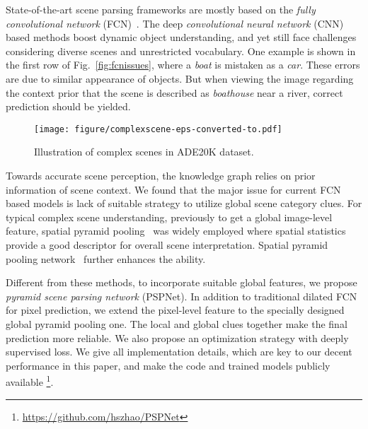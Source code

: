 \documentclass[10pt,twocolumn,letterpaper]{article}
\begin{document}
State-of-the-art scene parsing frameworks are mostly based on the {\it fully
convolutional network} (FCN)~\cite{long2015fully}. The deep {\it convolutional neural
network} (CNN) based methods boost dynamic object understanding, and yet still face
challenges considering diverse scenes and unrestricted vocabulary. One example is shown
in the first row of Fig.~\ref{fig:fcnissues}, where a {\it boat} is mistaken as a {\it
car}. These errors are due to similar appearance of objects. But when viewing the image
regarding the context prior that the scene is described as {\it boathouse} near a river,
correct prediction should be yielded.

\begin{figure}[t]
\centering
\texttt{[image: figure/complexscene-eps-converted-to.pdf]}
\caption{Illustration of complex scenes in ADE20K dataset. } \label{fig:intro}
\end{figure}

Towards accurate scene perception, the knowledge graph relies on prior information of
scene context. We found that the major issue for current FCN based models is lack of
suitable strategy to utilize global scene category clues. For typical complex scene
understanding, previously to get a global image-level feature, spatial pyramid
pooling~\cite{lazebnik2006beyond} was widely employed where spatial statistics provide a
good descriptor for overall scene interpretation. Spatial pyramid pooling
network~\cite{he2014spatial} further enhances the ability.

Different from these methods, to incorporate suitable global features, we propose {\it
pyramid scene parsing network} (PSPNet). In addition to traditional dilated FCN
\cite{chen2014semantic,yu2015multi} for pixel prediction, we extend the pixel-level
feature to the specially designed global pyramid pooling one. The local and global clues
together make the final prediction more reliable. We also propose an optimization
strategy with deeply supervised loss. We give all implementation details, which are key
to our decent performance in this paper, and make the code and trained models publicly
available
\footnote{\href{https://github.com/hszhao/PSPNet}{https://github.com/hszhao/PSPNet}}.
\end{document}
